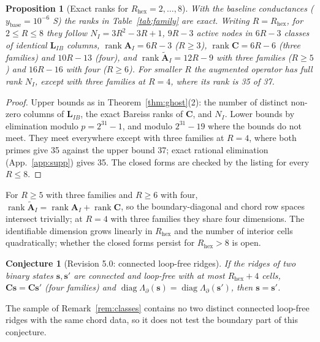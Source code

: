 \documentclass[11pt,a4paper]{article}
\newtheorem{proposition}[theorem]{Proposition}
\newtheorem{conjecture}[theorem]{Conjecture}
\theoremstyle{definition}
\theoremstyle{remark}
\begin{document}
\begin{proposition}[Exact ranks for $R_{\text{hex}} = 2,\dots,8$]\label{prop:family}
With the baseline conductances ($y_{\text{base}} = 10^{-6}$ S) the ranks in Table~\ref{tab:family} are exact. Writing $R = R_{\text{hex}}$, for $2\le R\le8$ they follow $N_I = 3R^2-3R+1$, $9R-3$ active nodes in $6R-3$ classes of identical $\mathbf{L}_{IB}$ columns, $\operatorname{rank}\mathbf{A}_I = 6R-3$ ($R\ge3$), $\operatorname{rank}\mathbf{C} = 6R-6$ (three families) and $10R-13$ (four), and $\operatorname{rank}\widetilde{\mathbf{A}}_I = 12R-9$ with three families ($R\ge5$) and $16R-16$ with four ($R\ge6$). For smaller $R$ the augmented operator has full rank $N_I$, except with three families at $R = 4$, where its rank is 35 of 37.
\end{proposition}
\begin{proof}
Upper bounds as in Theorem~\ref{thm:ghost}(2): the number of distinct non-zero columns of $\mathbf{L}_{IB}$, the exact Bareiss ranks of $\mathbf{C}$, and $N_I$. Lower bounds by elimination modulo $p = 2^{31}-1$, and modulo $2^{31}-19$ where the bounds do not meet. They meet everywhere except with three families at $R = 4$, where both primes give 35 against the upper bound 37; exact rational elimination (App.~\ref{app:supp}) gives 35. The closed forms are checked by the listing for every $R\le8$.
\end{proof}
For $R\ge5$ with three families and $R\ge6$ with four, $\operatorname{rank}\widetilde{\mathbf{A}}_I = \operatorname{rank}\mathbf{A}_I+\operatorname{rank}\mathbf{C}$, so the boundary-diagonal and chord row spaces intersect trivially; at $R = 4$ with three families they share four dimensions. The identifiable dimension grows linearly in $R_{\text{hex}}$ and the number of interior cells quadratically; whether the closed forms persist for $R_{\text{hex}}>8$ is open.

\begin{conjecture}[Revision 5.0: connected loop-free ridges]\label{conj:tree}
If the ridges of two binary states $\mathbf{s},\mathbf{s}'$ are connected and loop-free with at most $R_{\text{hex}}+4$ cells, $\mathbf{C}\mathbf{s} = \mathbf{C}\mathbf{s}'$ (four families) and $\operatorname{diag}\Lambda_\partial(\mathbf{s}) = \operatorname{diag}\Lambda_\partial(\mathbf{s}')$, then $\mathbf{s} = \mathbf{s}'$.
\end{conjecture}
The sample of Remark~\ref{rem:classes} contains no two distinct connected loop-free ridges with the same chord data, so it does not test the boundary part of this conjecture.
\end{document}

